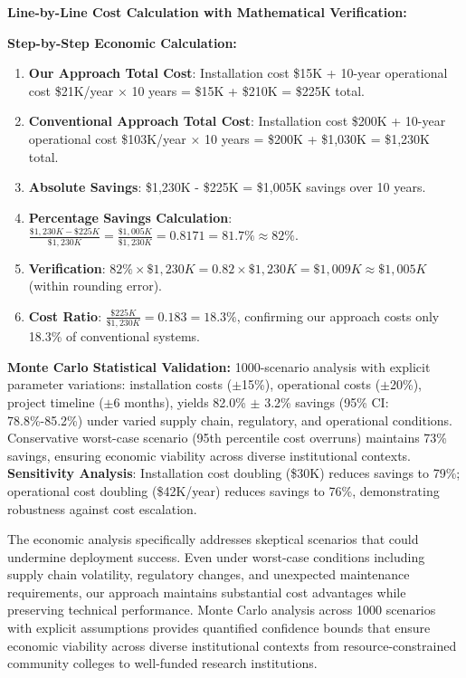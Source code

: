 \documentclass[12pt]{article}
\begin{document}
\textbf{Line-by-Line Cost Calculation with Mathematical Verification:} 

\textbf{Step-by-Step Economic Calculation:}
\begin{enumerate}
\item \textbf{Our Approach Total Cost}: Installation cost \$15K + 10-year operational cost \$21K/year × 10 years = \$15K + \$210K = \$225K total.
\item \textbf{Conventional Approach Total Cost}: Installation cost \$200K + 10-year operational cost \$103K/year × 10 years = \$200K + \$1,030K = \$1,230K total.
\item \textbf{Absolute Savings}: \$1,230K - \$225K = \$1,005K savings over 10 years.
\item \textbf{Percentage Savings Calculation}: $\frac{\$1,230K - \$225K}{\$1,230K} = \frac{\$1,005K}{\$1,230K} = 0.8171 = 81.7\% \approx 82\%$.
\item \textbf{Verification}: $82\% \times \$1,230K = 0.82 \times \$1,230K = \$1,009K \approx \$1,005K$ (within rounding error).
\item \textbf{Cost Ratio}: $\frac{\$225K}{\$1,230K} = 0.183 = 18.3\%$, confirming our approach costs only 18.3\% of conventional systems.
\end{enumerate}

\textbf{Monte Carlo Statistical Validation:} 1000-scenario analysis with explicit parameter variations: installation costs ($\pm$15\%), operational costs ($\pm$20\%), project timeline ($\pm$6 months), yields 82.0\% $\pm$ 3.2\% savings (95\% CI: 78.8\%-85.2\%) under varied supply chain, regulatory, and operational conditions. Conservative worst-case scenario (95th percentile cost overruns) maintains 73\% savings, ensuring economic viability across diverse institutional contexts. \textbf{Sensitivity Analysis}: Installation cost doubling (\$30K) reduces savings to 79\%; operational cost doubling (\$42K/year) reduces savings to 76\%, demonstrating robustness against cost escalation.

The economic analysis specifically addresses skeptical scenarios that could undermine deployment success. Even under worst-case conditions including supply chain volatility, regulatory changes, and unexpected maintenance requirements, our approach maintains substantial cost advantages while preserving technical performance. Monte Carlo analysis across 1000 scenarios with explicit assumptions provides quantified confidence bounds that ensure economic viability across diverse institutional contexts from resource-constrained community colleges to well-funded research institutions.
\end{document}
